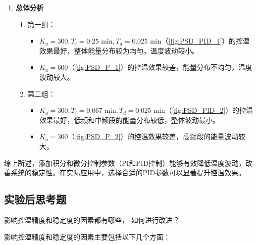 \documentclass[dvipsnames, svgnames,a4paper,11pt]{article}
\begin{document}
\begin{enumerate}
\begin{enumerate}
            \item \textbf{总体分析}
            \begin{enumerate}
                \item 第一组：
                \begin{itemize}
                    \item \( K_u = 300, T_i = 0.25 \text{ min}, T_d = 0.025 \text{ min} \)（\cref{fig:PSD_PID_1}）的控温效果最好，整体能量分布较为均匀，温度波动较小。
                    \item \( K_u = 600 \)（\cref{fig:PSD_P_1}）的控温效果较差，能量分布不均匀，温度波动较大。
                \end{itemize}
                
                \item 第二组：
                \begin{itemize}
                    \item \( K_u = 300, T_i = 0.067 \text{ min}, T_d = 0.025 \text{ min} \)（\cref{fig:PSD_PID_2}）的控温效果最好，低频和中频段的能量分布较低，整体波动最小。
                    \item \( K_u = 300 \)（\cref{fig:PSD_P_2}）的控温效果较差，高频段的能量波动较大。
                \end{itemize}
            \end{enumerate}
        \end{enumerate}
        
        综上所述，添加积分和微分控制参数（PI和PID控制）能够有效降低温度波动，改善系统的稳定性。在实际应用中，选择合适的PID参数可以显著提升控温效果。
        

    \end{enumerate}





		

\subsection{实验后思考题}	
	
    \begin{question}
        影响控温精度和稳定度的因素都有哪些， 如何进行改进？
    \end{question}

    影响控温精度和稳定度的因素主要包括以下几个方面：
\end{document}
